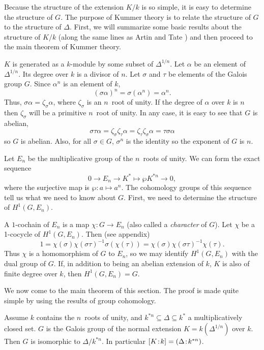 Because the structure of the extension $K/k$ is so simple, it is easy to
determine the structure of $G$.  The purpose of Kummer theory is to relate
the structure of $G$ to the structure of $\Delta$.  First, we will
summarize some basic results about the structure of $K/k$ (along the same
lines as Artin and Tate \cite{Artin1990-hu}) and then proceed to the main
theorem of Kummer theory.

$K$ is generated as a $k$-module by some subset of $\Delta^{1/n}$.  Let
$\alpha$ be an element of $\Delta^{1/n}$.  Its degree over $k$ is a divisor
of $n$.  Let $\sigma$ and $\tau$ be elements of the Galois group $G$.
Since $\alpha^n$ is an element of $k$,
\[
(\sigma\alpha)^n = \sigma(\alpha^n) = \alpha^n.
\]
Thus, $\sigma\alpha = \zeta_{\sigma} \alpha$, where $\zeta_{\sigma}$ is an
$n$\th\ root of unity.  If the degree of $\alpha$ over $k$ is $n$ then
$\zeta_{\sigma}$ will be a primitive $n$\th\ root of unity.  In any case,
it is easy to see that $G$ is abelian,
\[
\sigma\tau\alpha = \zeta_{\sigma} \zeta_{\tau} \alpha = 
\zeta_{\tau} \zeta_{\sigma} \alpha = \tau \sigma \alpha
\]
so $G$ is abelian.  Also, for all $\sigma \in G$,
$\sigma^n$ is the identity so the exponent of $G$ is $n$. 

Let $E_n$ be the multiplicative group of the $n$\th\ roots of unity.  We
can form the exact sequence
\[
0 \longrightarrow E_n \longrightarrow K^\ast \mapsto{\wp}
K^{\ast n} \longrightarrow 0,
\]
where the surjective map is $\wp : a \mapsto a^n$.  The cohomology groups
of this sequence tell us what we need to know about $G$.  First, we need to
determine the structure of $H^1(G, E_n)$.

A $1$-cochain of $E_n$ is a map $\chi : G \rightarrow E_n$ (also called a
{\em character} of $G$).  Let $\chi$ be a 1-cocycle of $H^1(G, E_n)$.  Then
(see appendix)
\[
1 = \chi(\sigma) \chi(\sigma \tau)^{-1} \sigma(\chi(\tau))
= \chi(\sigma) \chi(\sigma \tau)^{-1} \chi(\tau).
\]
Thus $\chi$ is a homomorphism of $G$ to $E_n$, so we may identify $H^1(G,
E_n)$ with the dual group of $G$.  If, in addition to being an abelian
extension of $k$, $K$ is also of finite degree over $k$, then $H^1(G, E_n)
= G$.

\medskip
We now come to the main theorem of this section.  The proof is made
quite simple by using the results of group cohomology.

\begin{proposition}
\label{Kummer:Radical:Prop}
Assume $k$ contains the $n$\th\ roots of unity, and $k^{\ast n}
\subseteq \Delta \subseteq k^{\ast}$ a multiplicatively closed set.
$G$ is the Galois group of the normal extension $K = k(\Delta^{1/n})$
over $k$.  Then $G$ is isomorphic to $\Delta/k^{\ast n}$.  In
particular $[K\!:\!k] = (\Delta\!:\!k^{\ast n})$.
\end{proposition}

